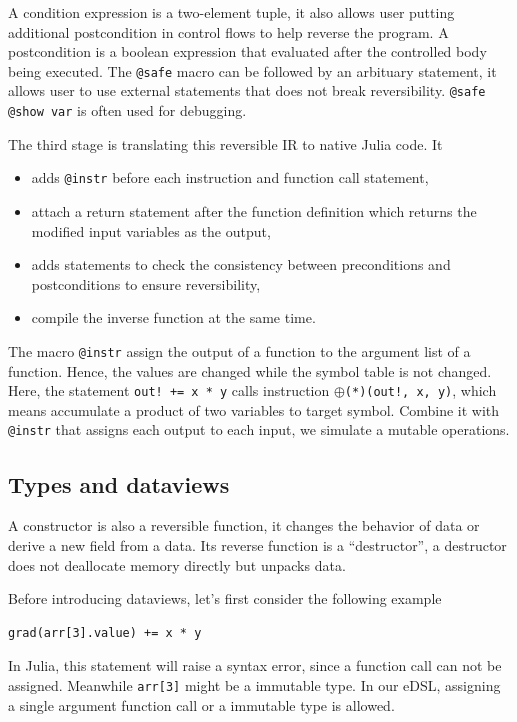 \documentclass[aps,twocolumn,longbibliography,english,superscriptaddress,prr]{revtex4-1}
\newcommand{\<}{\langle}
\renewcommand{\>}{\rangle}
\theoremstyle{definition}\newtheorem{definition}{\textit{Definition}}
\begin{document}
A condition expression is a two-element tuple, it also allows user putting additional postcondition in control flows to help reverse the program.
A postcondition is a boolean expression that evaluated after the controlled body being executed.
The \texttt{@safe} macro can be followed by an arbituary statement, it allows user to use external statements that does not break reversibility.
\texttt{@safe @show var} is often used for debugging.

The third stage is translating this reversible IR to native Julia code.
It
\begin{itemize}
    \item adds \texttt{@instr} before each instruction and function call statement,
    \item attach a return statement after the function definition which returns the modified input variables as the output,
    \item adds statements to check the consistency between preconditions and postconditions to ensure reversibility,
    \item compile the inverse function at the same time.
\end{itemize}
The macro \texttt{@instr} assign the output of a function to the argument list of a function. Hence, the values are changed while the symbol table is not changed. Here, the statement \texttt{out! += x * y} calls instruction \texttt{$\oplus$(*)(out!, x, y)}, which means accumulate a product of two variables to target symbol. Combine it with \texttt{@instr} that assigns each output to each input, we simulate a mutable operations.

\subsection{Types and dataviews}
A constructor is also a reversible function, it changes the behavior of data or derive a new field from a data.
Its reverse function is a ``destructor'', a destructor does not deallocate memory directly but unpacks data.

Before introducing dataviews, let's first consider the following example
\begin{minipage}{.44\textwidth}
\begin{lstlisting}
grad(arr[3].value) += x * y
\end{lstlisting}
\end{minipage}
In Julia, this statement will raise a syntax error, since a function call can not be assigned.
Meanwhile \texttt{arr[3]} might be a immutable type.
In our eDSL, assigning a single argument function call or a immutable type is allowed.
\end{document}
